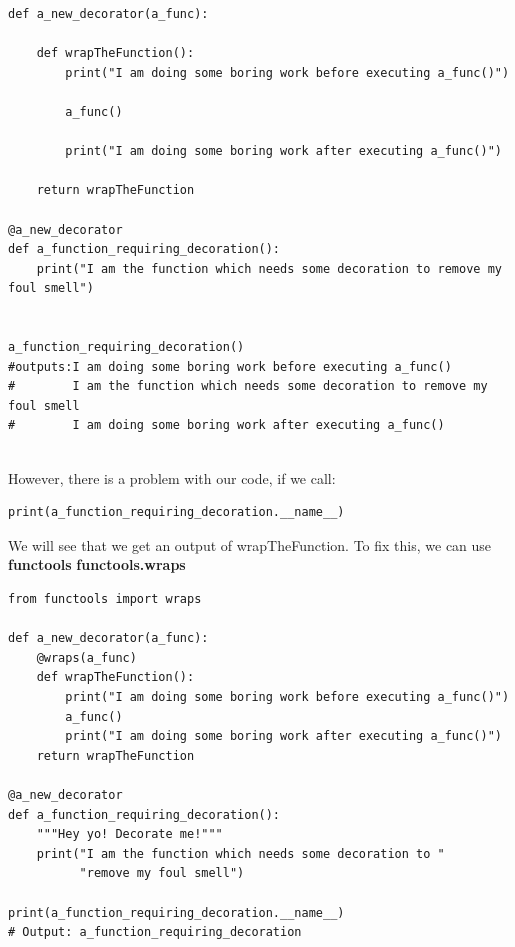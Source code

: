 \documentclass{report}
\begin{document}
    \begin{verbatim}
def a_new_decorator(a_func):

    def wrapTheFunction():
        print("I am doing some boring work before executing a_func()")

        a_func()

        print("I am doing some boring work after executing a_func()")

    return wrapTheFunction

@a_new_decorator
def a_function_requiring_decoration():
    print("I am the function which needs some decoration to remove my foul smell")


a_function_requiring_decoration()
#outputs:I am doing some boring work before executing a_func()
#        I am the function which needs some decoration to remove my foul smell
#        I am doing some boring work after executing a_func()


    \end{verbatim}
    \bigbreak \noindent 
    \bigbreak \noindent
    \pagebreak \bigbreak \noindent
    However, there is a problem with our code, if we call:
    \begin{verbatim}
print(a_function_requiring_decoration.__name__)
    \end{verbatim}
    We will see that we get an output of wrapTheFunction. To fix this, we can use \textbf{functools} \textbf{functools.wraps}
    \begin{verbatim}
from functools import wraps

def a_new_decorator(a_func):
    @wraps(a_func)
    def wrapTheFunction():
        print("I am doing some boring work before executing a_func()")
        a_func()
        print("I am doing some boring work after executing a_func()")
    return wrapTheFunction

@a_new_decorator
def a_function_requiring_decoration():
    """Hey yo! Decorate me!"""
    print("I am the function which needs some decoration to "
          "remove my foul smell")

print(a_function_requiring_decoration.__name__)
# Output: a_function_requiring_decoration
    \end{verbatim}
    \bigbreak \noindent 
\end{document}
